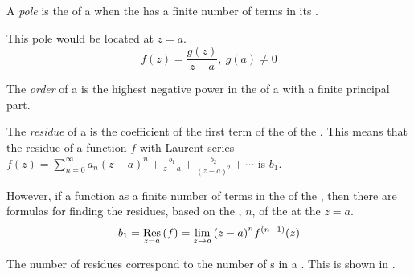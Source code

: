 \begin{definition}[Pole]\label{def:Pole}
  A \emph{pole} is the  of a  when the  has a finite number of terms in its .

  This pole would be located at $z=a$.
  \begin{equation}\label{eq:Pole}
    f(z) = \frac{g(z)}{z-a}, \: g(a) \neq 0
  \end{equation}
\end{definition}

\begin{definition}[Order]\label{def:Pole_Order}
  The \emph{order} of a  is the highest negative power in the  of a  with a finite principal part.
\end{definition}

\begin{definition}[Residue]\label{def:Residue}
  The \emph{residue} of a  is the coefficient of the first term of the  of the .
  This means that the residue of a function $f$ with Laurent series $f(z) = \sum_{n=0}^{\infty} a_{n} {(z-a)}^{n} + \frac{b_{1}}{z-a} + \frac{b_{2}}{{(z-a)}^{2}} + \cdots$ is $b_{1}$.

  However, if a function as a finite number of terms in the  of the , then there are formulas for finding the residues, based on the , $n$, of the  at the  $z=a$.
  \begin{equation}\label{eq:Residue}
    b_{1} = \Residue{f}{z=a} = \lim\limits_{z \to a} {(z-a)}^{n} f^{(n-1)}(z)
  \end{equation}

  The number of residues correspond to the number of s in a .
  This is shown in .
\end{definition}

